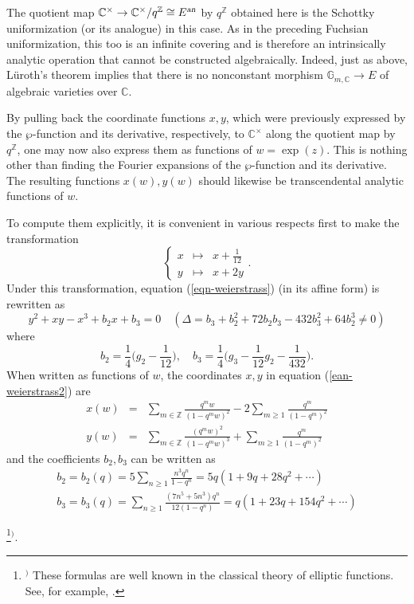 \documentclass[a4paper,12pt, dvipdfmx]{jsbook}
\def\Z{\mathbb{Z}}
\def\C{\mathbb{C}}
\def\G{\mathbb{G}}
\def\an{\textsl{an}}
\theoremstyle{plain}
\theoremstyle{definition}
\newcounter{chushaku}
\def\chu#1{\addtocounter{chushaku}{1}\footnote[\value{chushaku}]{${}^)$ #1}${}^)$}
\begin{document}
The quotient map $\C^{\times}\rightarrow\C^{\times}/q^{\Z}\cong E^{\an}$ by $q^{\Z}$ obtained here is the Schottky uniformization (or its analogue) in this case.
As in the preceding Fuchsian uniformization, this too is an infinite covering and is therefore an intrinsically analytic operation that cannot be constructed algebraically.
Indeed, just as above, L\"uroth's theorem implies that there is no nonconstant morphism $\G_{m,\C}\rightarrow E$ of algebraic varieties over $\C$.

By pulling back the coordinate functions $x,y$, which were previously expressed by the $\wp$-function and its derivative, respectively, to $\C^{\times}$ along the quotient map by $q^{\Z}$, one may now also express them as functions of $w=\exp(z)$.
This is nothing other than finding the Fourier expansions of the $\wp$-function and its derivative.
The resulting functions $x(w),y(w)$ should likewise be transcendental analytic functions of $w$.

To compute them explicitly, it is convenient in various respects first to make the transformation
$$
\left\{\begin{array}{ccc}
x&\mapsto&x+\frac{1}{12}\\
y&\mapsto&x+2y
\end{array}\right..
$$
Under this transformation, equation (\ref{eqn-weierstrass}) (in its affine form) is rewritten as
\begin{equation}\label{ean-weierstrass2}
y^2+xy-x^3+b_2x+b_3=0\quad (\Delta=b_3+b^2_2+72b_2b_3-432b^2_3+64b^3_2\neq 0)
\end{equation}
where
$$
b_2=\frac{1}{4}\bigg(g_2-\frac{1}{12}\bigg),\quad b_3=\frac{1}{4}\bigg(g_3-\frac{1}{12}g_2-\frac{1}{432}\bigg).
$$
When written as functions of $w$, the coordinates $x,y$ in equation (\ref{ean-weierstrass2}) are
\begin{equation}\label{eqn-xy}
\begin{array}{ccl}
x(w)&=&{\displaystyle \sum_{m\in\Z}\frac{q^mw}{(1-q^mw)^2}-2\sum_{m\geq 1}\frac{q^m}{(1-q^m)^2}}\\
y(w)&=&{\displaystyle \sum_{m\in\Z}\frac{(q^mw)^2}{(1-q^mw)^3}+\sum_{m\geq 1}\frac{q^m}{(1-q^m)^2}}
\end{array}
\end{equation}
and the coefficients $b_2,b_3$ can be written as
\begin{equation}\label{eqn-b2b3}
\begin{array}{l}
{\displaystyle b_2=b_2(q)=5\sum_{n\geq 1}\frac{n^3q^n}{1-q^n}=5q(1+9q+28q^2+\cdots)}\\
{\displaystyle b_3=b_3(q)=\sum_{n\geq 1}\frac{(7n^5+5n^3)q^n}{12(1-q^n)}=q(1+23q+154q^2+\cdots)}
\end{array}
\end{equation}
\chu{These formulas are well known in the classical theory of elliptic functions. See, for example, \cite[Chap. 2, \S12]{HC}.}.
\end{document}
